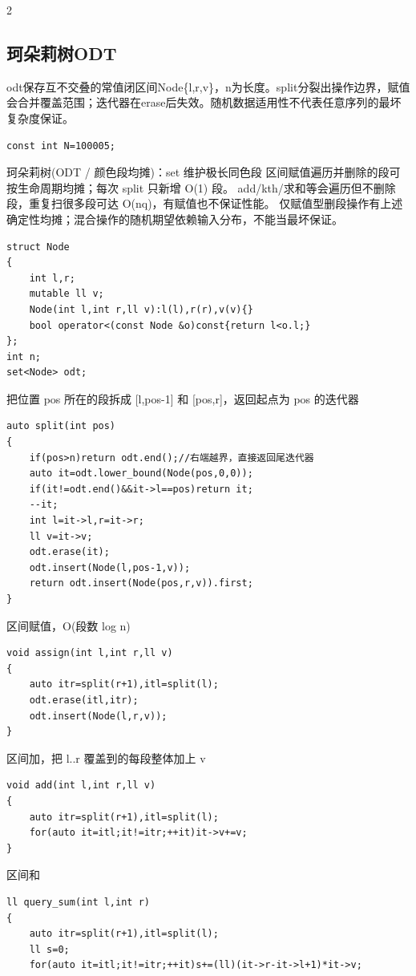 \documentclass[UTF8,fontset=fandol,a4paper,twoside]{ctexart}
\newcommand{\note}[1]{{\fontsize{10}{12}\selectfont #1\par}}
\begin{document}
\begin{multicols}{2}
\subsection{珂朵莉树ODT}

\note{odt保存互不交叠的常值闭区间Node\{l,\allowbreak{}r,\allowbreak{}v\}，n为长度。split分裂出操作边界，赋值会合并覆盖范围；迭代器在erase后失效。随机数据适用性不代表任意序列的最坏复杂度保证。}
\begin{lstlisting}
const int N=100005;
\end{lstlisting}
\note{珂朵莉树(\allowbreak{}ODT /\allowbreak{} 颜色段均摊)\allowbreak{}：set 维护极长同色段 区间赋值遍历并删除的段可按生命周期均摊；每次 split 只新增 O(\allowbreak{}1)\allowbreak{} 段。 add/\allowbreak{}kth/\allowbreak{}求和等会遍历但不删除段，重复扫很多段可达 O(\allowbreak{}nq)\allowbreak{}，有赋值也不保证性能。 仅赋值型删段操作有上述确定性均摊；混合操作的随机期望依赖输入分布，不能当最坏保证。}
\begin{lstlisting}
struct Node
{
    int l,r;
    mutable ll v;
    Node(int l,int r,ll v):l(l),r(r),v(v){}
    bool operator<(const Node &o)const{return l<o.l;}
};
int n;
set<Node> odt;
\end{lstlisting}
\note{把位置 pos 所在的段拆成 [\allowbreak{}l,\allowbreak{}pos-\allowbreak{}1]\allowbreak{} 和 [\allowbreak{}pos,\allowbreak{}r]\allowbreak{}，返回起点为 pos 的迭代器}
\begin{lstlisting}
auto split(int pos)
{
    if(pos>n)return odt.end();//右端越界，直接返回尾迭代器
    auto it=odt.lower_bound(Node(pos,0,0));
    if(it!=odt.end()&&it->l==pos)return it;
    --it;
    int l=it->l,r=it->r;
    ll v=it->v;
    odt.erase(it);
    odt.insert(Node(l,pos-1,v));
    return odt.insert(Node(pos,r,v)).first;
}
\end{lstlisting}
\note{区间赋值，O(\allowbreak{}段数 log n)\allowbreak{}}
\begin{lstlisting}
void assign(int l,int r,ll v)
{
    auto itr=split(r+1),itl=split(l);
    odt.erase(itl,itr);
    odt.insert(Node(l,r,v));
}
\end{lstlisting}
\note{区间加，把 l.\allowbreak{}.\allowbreak{}r 覆盖到的每段整体加上 v}
\begin{lstlisting}
void add(int l,int r,ll v)
{
    auto itr=split(r+1),itl=split(l);
    for(auto it=itl;it!=itr;++it)it->v+=v;
}
\end{lstlisting}
\note{区间和}
\begin{lstlisting}
ll query_sum(int l,int r)
{
    auto itr=split(r+1),itl=split(l);
    ll s=0;
    for(auto it=itl;it!=itr;++it)s+=(ll)(it->r-it->l+1)*it->v;

\end{lstlisting}
\end{multicols}
\end{document}
